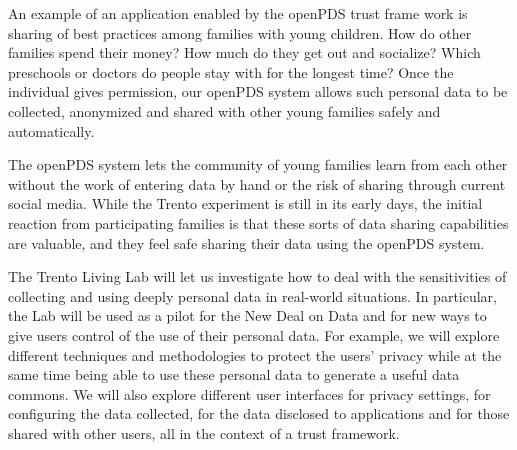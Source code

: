 An example of an application enabled by the openPDS trust frame work is sharing of best practices among families with young children. How do other families spend their money? How much do they get out and socialize? Which preschools or doctors do people stay with for the longest time? Once the individual gives permission, our openPDS system allows such personal data to be collected, anonymized and shared with other young families safely and automatically.

The openPDS system lets the community of young families learn from each other without the work of entering data by hand or the risk of sharing through current social media. While the Trento experiment is still in its early days, the initial reaction from participating families is that these sorts of data sharing capabilities are valuable, and they feel safe sharing their data using the openPDS system.

The Trento Living Lab will let us investigate how to deal with the sensitivities of collecting and using deeply personal data in real-world situations. In particular, the Lab will be used as a pilot for the New Deal on Data and for new ways to give users control of the use of their personal data. For example, we will explore different techniques and methodologies to protect the users’ privacy while at the same time being able to use these personal data to generate a useful data commons. We will also explore different user interfaces for privacy settings, for configuring the data collected, for the data disclosed to applications and for those shared with other users, all in the context of a trust framework.
